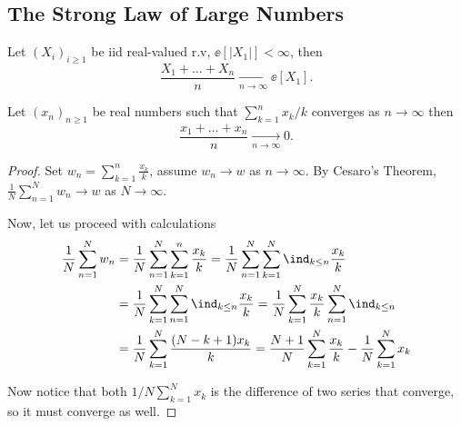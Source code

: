 \documentclass[../main.tex]{subfiles}
\begin{document}
   \subsection{The Strong Law of Large Numbers}
   \begin{theorem}
     Let $(X_i)_{i \geq 1}$ be iid real-valued r.v, $\ee[|X_1|] < \infty$,
     then
     \[
       \frac{X_1 + \ldots + X_n}{n} \underset{n \to \infty}{\longrightarrow}
       \ee[X_1] 
     .\] 
   \end{theorem}
   \begin{lemma}
     [Kronecker]
     Let $(x_n)_{n \geq 1}$ be real numbers such that $\sum_{k = 1}^n x_k / k$
     converges as $n \to \infty$ then
     \[
       \frac{x_1 + \ldots + x_n}{n} \underset{n \to \infty}{\longrightarrow}
       0
     .\] 
   \end{lemma}
   \begin{proof}
       Set $w_n = \sum_{k=1}^n \frac{x_k}{k} $, assume $w_n \to w$ as $n \to
       \infty$. By Cesaro's Theorem, $\frac{1}{N} \sum_{n=1}^N w_n \to w$ as
       $N \to \infty$.

       Now, let us proceed with calculations
       \begin{align*}
         \frac{1}{N} \sum_{n = 1}^N w_n &= \frac{1}{N} \sum_{n = 1}^N
         \sum_{k=1}^ n \frac{x_k}{k} 
         = \frac{1}{N} \sum_{n=1}^N \sum_{k =1}^N \ind_{k \leq n}
         \frac{x_k}{k} \\
         &= \frac{1}{N} \sum_{k=1}^N \sum_{n =1}^N \ind_{k \leq n}
         \frac{x_k}{k} 
         = \frac{1}{N} \sum_{k=1}^N \frac{x_k}{k} \sum_{n =1}^N \ind_{k \leq
         n} \\
         &= \frac{1}{N} \sum_{k=1}^N \frac{(N - k + 1)x_k}{k} 
         = \frac{N+1}{N} \sum_{k=1}^N \frac{x_k}{k} - \frac{1}{N} \sum_{k=1}^N
         x_k
       \end{align*}

       Now notice that both $1/N \sum_{k=1}^N x_k$ is the difference of two
       series that converge, so it must converge as well.
   \end{proof}
\end{document}
